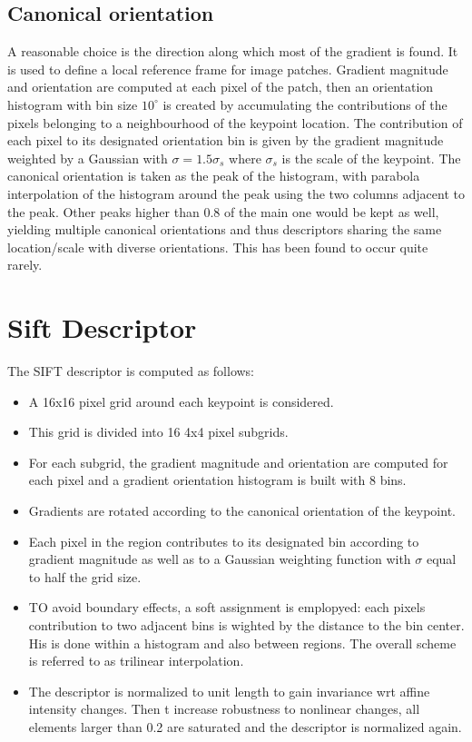 \documentclass{article}
\begin{document}
\subsection{Canonical orientation}
A reasonable choice is the direction along which most of the gradient is found. It is used to define a local reference frame for image patches. Gradient magnitude and orientation are computed at each pixel of the patch, then an orientation histogram with bin size $10^\circ$ is created by accumulating the contributions of the pixels belonging to a neighbourhood of the keypoint location. The contribution of each pixel to its designated orientation bin is given by the gradient magnitude weighted by a Gaussian with $\sigma = 1.5\sigma_s$ where $\sigma_s$ is the scale of the keypoint. The canonical orientation is taken as the peak of the histogram, with parabola interpolation of the histogram around the peak using the two columns adjacent to the peak. Other peaks higher than 0.8 of the main one would be kept as well, yielding multiple canonical orientations and thus descriptors sharing the same location/scale with diverse orientations. This has been found to occur quite rarely.

\section{Sift Descriptor}
The SIFT descriptor is computed as follows: 
\begin{itemize}
    \item A 16x16 pixel grid around each keypoint is considered.
    \item This grid is divided into 16 4x4 pixel subgrids.
    \item For each subgrid, the gradient magnitude and orientation are computed for each pixel and a gradient orientation histogram is built with 8 bins.
    \item Gradients are rotated according to the canonical orientation of the keypoint.
    \item Each pixel in the region contributes to its designated bin according to gradient magnitude as well as to a Gaussian weighting function with $\sigma$ equal to half the grid size. 
    \item TO avoid boundary effects, a soft assignment is emplopyed: each pixels contribution to two adjacent bins is wighted by the distance to the bin center. His is done within a histogram and also between regions. The overall scheme is referred to as trilinear interpolation. 
    \item The descriptor is normalized to unit length to gain invariance wrt affine intensity changes. Then t increase robustness to nonlinear changes, all elements larger than 0.2 are saturated and the descriptor is normalized again.
\end{itemize}
\end{document}
